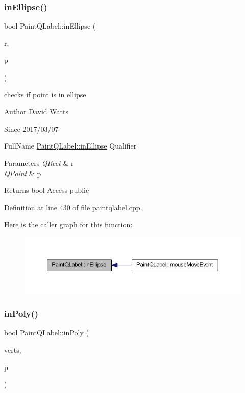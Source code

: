 \subsubsection{\texorpdfstring{in\+Ellipse()}{inEllipse()}}
{\footnotesize\ttfamily bool Paint\+Q\+Label\+::in\+Ellipse (\begin{DoxyParamCaption}\item[{Q\+Rect}]{r,  }\item[{Q\+Point}]{p }\end{DoxyParamCaption})}

checks if point is in ellipse

\begin{DoxyAuthor}{Author}
David Watts 
\end{DoxyAuthor}
\begin{DoxySince}{Since}
2017/03/07
\end{DoxySince}
Full\+Name \hyperlink{class_paint_q_label_a2ba7f833ed473795ad0e9f1ccb0f29b3}{Paint\+Q\+Label\+::in\+Ellipse} Qualifier 
\begin{DoxyParams}{Parameters}
{\em Q\+Rect} & r \\
\hline
{\em Q\+Point} & p \\
\hline
\end{DoxyParams}
\begin{DoxyReturn}{Returns}
bool Access public 
\end{DoxyReturn}


Definition at line 430 of file paintqlabel.\+cpp.

Here is the caller graph for this function\+:
\nopagebreak
\begin{figure}[H]
\begin{center}
\leavevmode
\includegraphics[width=350pt]{class_paint_q_label_a2ba7f833ed473795ad0e9f1ccb0f29b3_icgraph}
\end{center}
\end{figure}
\mbox{\label{class_paint_q_label_af6562b147730457b828f0c776ff001e6}} 
\subsubsection{\texorpdfstring{in\+Poly()}{inPoly()}}
{\footnotesize\ttfamily bool Paint\+Q\+Label\+::in\+Poly (\begin{DoxyParamCaption}\item[{Q\+Vector$<$ Q\+Point $>$}]{verts,  }\item[{Q\+Point}]{p }\end{DoxyParamCaption})}

